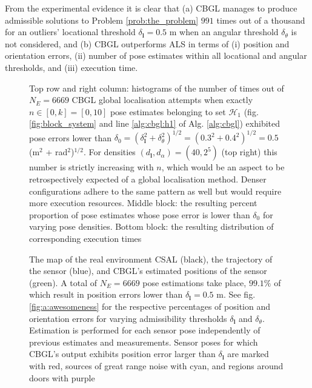 From the experimental evidence it is clear that (a) CBGL manages to produce
admissible solutions to Problem \ref{prob:the_problem} $991$ times out of a
thousand for an outliers' locational threshold $\delta_{\bm{l}} = 0.5$ m when
an angular threshold $\delta_{\theta}$ is not considered, and (b) CBGL
outperforms ALS in terms of (i) position and orientation errors, (ii) number of
pose estimates within all locational and angular thresholds, and (iii) execution
time.


\begin{figure}
  \vspace{-0.4cm}
  
  \vspace{-0.4cm}
  \caption{\small Top row and right column: histograms of the number of times
           out of $N_E = 6669$ CBGL global localisation attempts
           when exactly $n \in [0,k] = [0,10]$ pose estimates belonging to set
           $\mathcal{H}_1$ (fig. \ref{fig:block_system} and line
           \ref{alg:cbgl:h1} of Alg. \ref{alg:cbgl}) exhibited pose errors
           lower than $\delta_0 = (\delta_{\bm{l}}^2 + \delta_{\theta}^2)^{1/2} =
           (0.3^2 + 0.4^2)^{1/2} = 0.5$ (m$^2$ + rad$^2$)$^{1/2}$. For
           densities $(d_{\bm{l}},d_{\alpha}) = (40, 2^5)$ (top right) this
           number is strictly increasing with $n$, which would be
           an aspect to be retrospectively expected of a global localisation
           method. Denser configurations adhere to the same pattern as well but
           would require more execution resources. Middle block: the resulting
           percent proportion of pose estimates whose pose error is lower than
           $\delta_0$ for varying pose densities. Bottom block: the resulting
           distribution of corresponding execution times
           }
  \label{fig:a:determine_40_32}
\end{figure}


\begin{figure}
  \vspace{-0.7cm}
  
  \vspace{-0.7cm}
  \caption{\small The map of the real environment CSAL (black), the trajectory
           of the sensor (blue), and CBGL's estimated positions of the sensor
           (green). A total of $N_E = 6669$ pose estimations take place,
           $99.1\%$ of which result in position errors lower than
           $\delta_{\bm{l}} = 0.5$ m. See fig. \ref{fig:a:awesomeness}
           for the respective percentages of position and orientation errors
           for varying admissibility thresholds $\delta_{\bm{l}}$ and
           $\delta_{\theta}$.
           Estimation is performed for each sensor
           pose independently of previous estimates and measurements. Sensor
           poses for which CBGL's output exhibits position error larger than
           $\delta_{\bm{l}}$ are marked with red, sources of great
           range noise with cyan, and regions around doors with purple
           }
  \label{fig:a:map_and_trajectory}
  \vspace{-0.5cm}
\end{figure}

